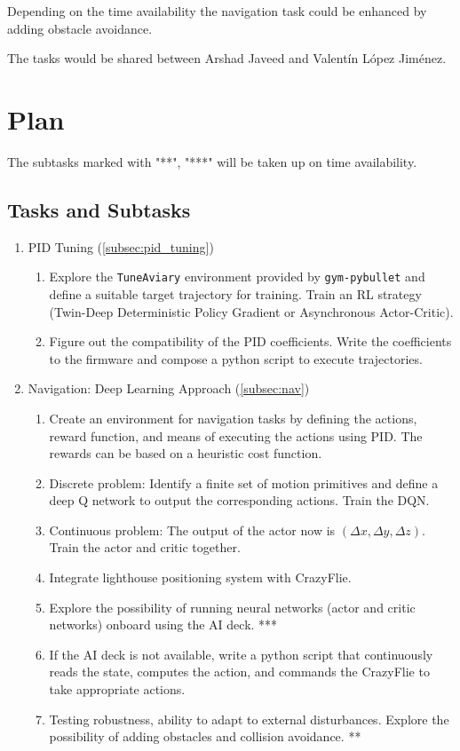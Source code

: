 \documentclass{article}
\begin{document}
Depending on the time availability the navigation task could be enhanced by adding obstacle avoidance.

The tasks would be shared between Arshad Javeed and Valentín López Jiménez.

\section{Plan}

The subtasks marked with "**", "***" will be taken up on time availability.

\subsection{Tasks and Subtasks}
\begin{enumerate}
	\item PID Tuning (\ref{subsec:pid_tuning})
	\begin{enumerate}
		\item Explore the \verb|TuneAviary| environment provided by \verb|gym-pybullet| and define a suitable target trajectory for training. Train an RL strategy (Twin-Deep Deterministic Policy Gradient or Asynchronous Actor-Critic).
		\item Figure out the compatibility of the PID coefficients. Write the coefficients to the firmware and compose a python script to execute trajectories.
	\end{enumerate}
	\item Navigation: Deep Learning Approach (\ref{subsec:nav})
	\begin{enumerate}
		\item Create an environment for navigation tasks by defining the actions, reward function, and means of executing the actions using PID. The rewards can be based on a heuristic cost function.
		\item Discrete problem: Identify a finite set of motion primitives and define a deep Q network to output the corresponding actions. Train the DQN.
		\item Continuous problem: The output of the actor now is $(\Delta x, \Delta y, \Delta z)$. Train the actor and critic together.
		\item Integrate lighthouse positioning system with CrazyFlie.
		\item Explore the possibility of running neural networks (actor and critic networks) onboard using the AI deck. ***
		\item If the AI deck is not available, write a python script that continuously reads the state, computes the action, and commands the CrazyFlie to take appropriate actions.
		\item Testing robustness, ability to adapt to external disturbances. Explore the possibility of adding obstacles and collision avoidance. **
	\end{enumerate}
\end{enumerate}
 
\end{document}

